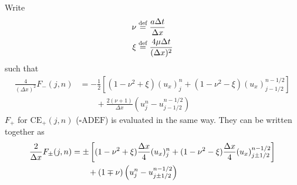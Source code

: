 \documentclass{turgon}
\begin{document}
Write
\begin{align}
  \nu &\defeq \frac{a\Delta t}{\Delta x} \label{e:nu} \\
  \xi &\defeq \frac{4\mu\Delta t}{(\Delta x)^2} \label{e:xi}
\end{align}
such that
\begin{align*}
  \frac{4}{(\Delta x)^2}F_-(j,n) &=
    -\frac{1}{2}\left[
      (1-\nu^2+\xi)(u_x)_j^n + (1-\nu^2-\xi)(u_x)_{j-1/2}^{n-1/2}
    \right] \\
  &\quad\quad
  + \frac{2(\nu+1)}{\Delta x}\left(u_j^n-u_{j-1/2}^{n-1/2}\right)
\end{align*}
$F_+$ for $\mathrm{CE}_+(j,n)$ ($\square\mathrm{ADEF}$) is evaluated in the
same way.  They can be written together as
\begin{align}
  \frac{2}{\Delta x}F_{\pm}(j,n) &=
    \pm\left[
        (1-\nu^2+\xi)\frac{\Delta x}{4}(u_x)_j^n
      + (1-\nu^2-\xi)\frac{\Delta x}{4}(u_x)_{j\pm1/2}^{n-1/2}
    \right] \notag \\
  &\quad\quad
  + (1\mp\nu)\left(u_j^n-u_{j\pm1/2}^{n-1/2}\right)
    \label{e:both_conserv_func}
\end{align}
\end{document}
